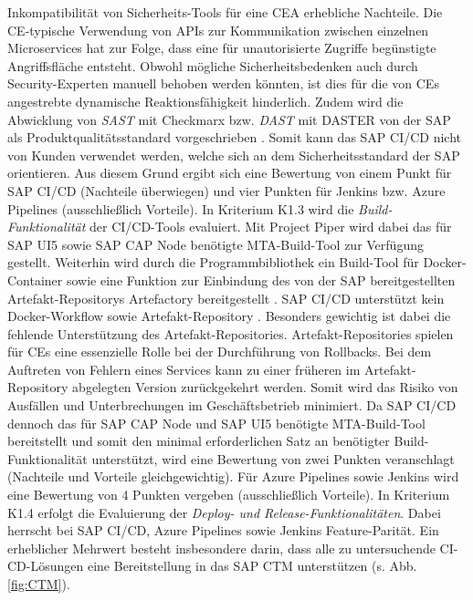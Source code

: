 Inkompatibilität von Sicherheits-Tools für eine CEA erhebliche Nachteile. Die CE-typische Verwendung von APIs zur Kommunikation zwischen einzelnen Microservices hat zur Folge, dass eine für unautorisierte Zugriffe begünstigte Angriffsfläche entsteht. Obwohl mögliche Sicherheitsbedenken auch durch Security-Experten manuell behoben werden könnten, ist dies für die von CEs angestrebte dynamische Reaktionsfähigkeit hinderlich. Zudem wird die Abwicklung von \textit{\ac{SAST}} mit Checkmarx bzw. \textit{\ac{DAST}} mit DASTER von der SAP als Produktqualitätsstandard vorgeschrieben \cite[Z. 37 ff.]{ProductManagerSAPHyperspaceSecurityTools.}. Somit kann das SAP CI/CD nicht von Kunden verwendet werden, welche sich an dem Sicherheitsstandard der SAP orientieren. Aus diesem Grund ergibt sich eine Bewertung von einem Punkt für SAP CI/CD (Nachteile überwiegen) und vier Punkten für Jenkins bzw. Azure Pipelines (ausschließlich Vorteile). In Kriterium K1.3 wird die \textit{Build-Funktionalität} der CI/CD-Tools evaluiert. Mit Project Piper wird dabei das für SAP UI5 sowie SAP CAP Node benötigte MTA-Build-Tool zur Verfügung gestellt. Weiterhin wird durch die Programmbibliothek ein Build-Tool für Docker-Container sowie eine Funktion zur Einbindung des von der SAP bereitgestellten Artefakt-Repositorys Artefactory bereitgestellt \cite{.20230406}. SAP CI/CD unterstützt kein Docker-Workflow sowie Artefakt-Repository \cite{.20230406b}. Besonders gewichtig ist dabei die fehlende Unterstützung des Artefakt-Repositories. Artefakt-Repositories spielen für CEs eine essenzielle Rolle bei der Durchführung von Rollbacks. Bei dem Auftreten von Fehlern eines Services kann zu einer früheren im Artefakt-Repository abgelegten Version zurückgekehrt werden. Somit wird das Risiko von Ausfällen und Unterbrechungen im Geschäftsbetrieb minimiert. Da SAP CI/CD dennoch das für SAP CAP Node und SAP UI5 benötigte MTA-Build-Tool bereitstellt und somit den minimal erforderlichen Satz an benötigter Build-Funktionalität unterstützt, wird eine Bewertung von zwei Punkten veranschlagt (Nachteile und Vorteile gleichgewichtig). Für Azure Pipelines sowie Jenkins wird eine Bewertung von 4 Punkten vergeben (ausschließlich Vorteile). In Kriterium K1.4 erfolgt die Evaluierung der \textit{Deploy- und Release-Funktionalitäten}. Dabei herrscht bei SAP CI/CD, Azure Pipelines sowie Jenkins Feature-Parität. Ein erheblicher Mehrwert besteht insbesondere darin, dass alle zu untersuchende CI-CD-Lösungen eine Bereitstellung in das SAP CTM unterstützen (s. Abb. \ref{fig:CTM}).
